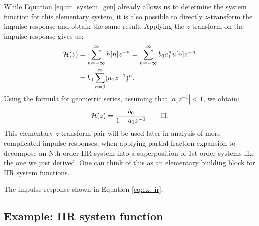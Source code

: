 While Equation \ref{eq:iir_system_gen} already allows us to determine the system function for this elementary system, it is also possible to directly $z$-transform the impulse response and obtain the same result. Applying the $z$-transform on the impulse response gives us:
\begin{align}
\mathcal{H}(z) &= \sum_{n=-\infty}^{\infty} h[n] z^{-n} = \sum_{n=-\infty}^{\infty}  b_0 a_1^n u[n] z^{-n} \\
&=  b_0 \sum_{n=0}^{\infty} (a_1 z^{-1})^n.
\end{align}
Using the formula for geometric series, assuming that $|a_1 z^{-1}|<1$,
we obtain:
\begin{equation}
\mathcal{H}(z) = \frac{b_0}{1-a_1 z^{-1}}\qed.
\end{equation}
This elementary $z$-transform pair will be used later in analysis of
more complicated impulse responses, when applying partial fraction
expansion to decompose an Nth order IIR system into a superposition of
1st order systems like the one we just derived. One can think of this
as an elementary building block for IIR system functions.

\begin{marginfigure}
\begin{center}
\end{center}
\caption{The impulse response shown in Equation \ref{eq:ex_ir}.}
\label{fig:elementary_1st_h_ir}
\end{marginfigure}

\subsection{Example: IIR system function}


